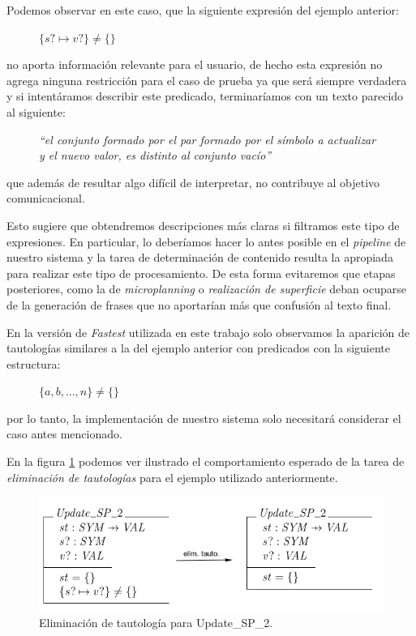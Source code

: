 Podemos observar en este caso, que la siguiente expresión del ejemplo anterior:

\begin{figure}[H]
  \centering
  $\{ s? \mapsto v? \} \neq \{ \}$ 
\end{figure}

\noindent
no aporta información relevante para el usuario, de hecho esta expresión no agrega ninguna restricción para el caso de prueba ya que será siempre verdadera y si intentáramos describir este predicado, terminaríamos con un texto parecido al siguiente:

\begin{figure}[H]
  \centering
  \emph{``el conjunto formado por el par formado por el símbolo a actualizar y el nuevo valor, es distinto al conjunto vacío''}
\end{figure}

\noindent
que además de resultar algo difícil de interpretar, no contribuye al objetivo comunicacional.

Esto sugiere que obtendremos descripciones más claras si filtramos este tipo de expresiones. En particular, lo deberíamos hacer lo antes posible en el \textit{pipeline} de nuestro sistema y la tarea de determinación de contenido resulta la apropiada para realizar este tipo de procesamiento. De esta forma evitaremos que etapas posteriores, como la de \emph{microplanning} o \emph{realización de superficie} deban ocuparse de la generación de frases que no aportarían más que confusión al texto final.

En la versión de \emph{Fastest} utilizada en este trabajo solo observamos la aparición de tautologías similares a la del ejemplo anterior con predicados con la siguiente estructura:

\begin{figure}[H]
  \centering
  $\{ a, b, ... , n \} \neq \{ \}$ 
\end{figure}

\noindent
por lo tanto, la implementación de nuestro sistema solo necesitará considerar el caso antes mencionado. 

En la figura \ref{fig:ej_elim_tauto} podemos ver ilustrado el comportamiento esperado de la tarea de \emph{eliminación de tautologías} para el ejemplo utilizado anteriormente.

\begin{figure}[H]
  	\centering
	\includegraphics[scale=0.4]{img/ej_elim_tauto.png}
	\caption{Eliminación de tautología para Update\_SP\_2.}
  	\label{fig:ej_elim_tauto}
\end{figure}

